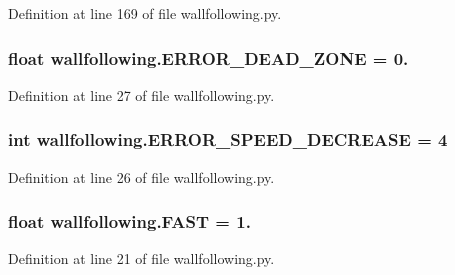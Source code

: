 Definition at line 169 of file wallfollowing.\+py.

\subsubsection[{\texorpdfstring{E\+R\+R\+O\+R\+\_\+\+D\+E\+A\+D\+\_\+\+Z\+O\+NE}{ERROR_DEAD_ZONE}}]{\setlength{\rightskip}{0pt plus 5cm}float wallfollowing.\+E\+R\+R\+O\+R\+\_\+\+D\+E\+A\+D\+\_\+\+Z\+O\+NE = 0.}\hypertarget{namespacewallfollowing_ac87d5f143cfd44f170a1d385ebd1a71b}{}\label{namespacewallfollowing_ac87d5f143cfd44f170a1d385ebd1a71b}


Definition at line 27 of file wallfollowing.\+py.

\subsubsection[{\texorpdfstring{E\+R\+R\+O\+R\+\_\+\+S\+P\+E\+E\+D\+\_\+\+D\+E\+C\+R\+E\+A\+SE}{ERROR_SPEED_DECREASE}}]{\setlength{\rightskip}{0pt plus 5cm}int wallfollowing.\+E\+R\+R\+O\+R\+\_\+\+S\+P\+E\+E\+D\+\_\+\+D\+E\+C\+R\+E\+A\+SE = 4}\hypertarget{namespacewallfollowing_a205d8fd2e51cc16818cb679f6c87c861}{}\label{namespacewallfollowing_a205d8fd2e51cc16818cb679f6c87c861}


Definition at line 26 of file wallfollowing.\+py.

\subsubsection[{\texorpdfstring{F\+A\+ST}{FAST}}]{\setlength{\rightskip}{0pt plus 5cm}float wallfollowing.\+F\+A\+ST = 1.}\hypertarget{namespacewallfollowing_ab1e7c06b4efb8e38a97ac8ec783a6beb}{}\label{namespacewallfollowing_ab1e7c06b4efb8e38a97ac8ec783a6beb}


Definition at line 21 of file wallfollowing.\+py.

